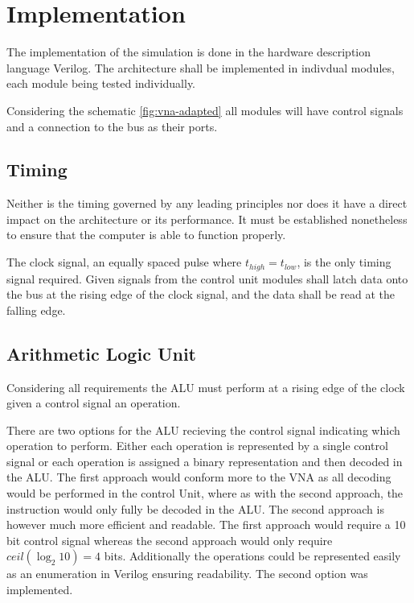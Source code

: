\section{Implementation}



The implementation of the simulation is done in the hardware description language Verilog. The architecture shall be implemented in indivdual modules, each module being tested individually.    

Considering the schematic \ref{fig:vna-adapted} all modules will have control signals and a connection to the bus as their ports.  

\subsection{Timing}
Neither is the timing governed by any leading principles nor does it have a direct impact on the architecture or its performance. It must be established nonetheless to ensure that the computer is able to function properly.

The clock signal, an equally spaced pulse where $t_{high} = t_{low}$, is the only timing signal required. Given signals from the control unit modules shall latch data onto the bus at the rising edge of the clock signal, and the data shall be read at the falling edge.



\subsection{Arithmetic Logic Unit}
Considering all requirements the ALU must perform at a rising edge of the clock given a control signal an operation. 


There are two options for the ALU recieving the control signal indicating which operation to perform. Either each operation is represented by a single control signal or each operation is assigned a binary representation and then decoded in the ALU. The first approach would conform more to the VNA as all decoding would be performed in the control Unit, where as with the second approach, the instruction would only fully be decoded in the ALU. The second approach is however much more efficient and readable. The first approach would require a 10 bit control signal whereas the second approach would only require $ceil(\log_2 10) = 4$ bits. Additionally the operations could be represented easily as an enumeration in Verilog ensuring readability. The second option was implemented. 

